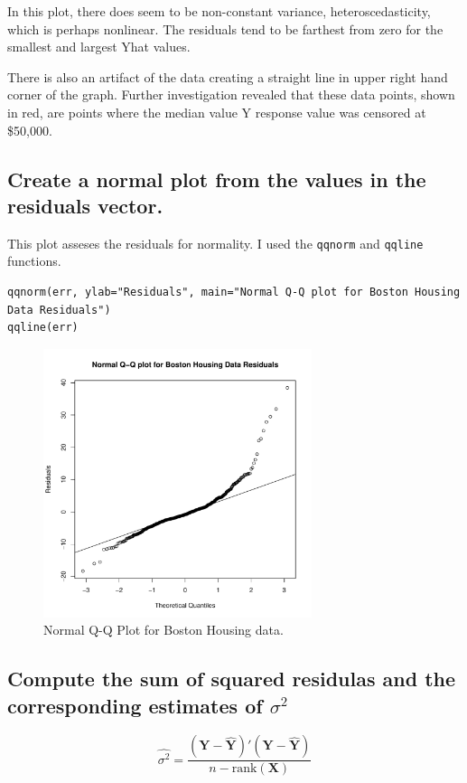 \documentclass[11pt]{article}
\begin{document}
In this plot, there does seem to be non-constant variance,
heteroscedasticity, which is perhaps nonlinear. The residuals 
tend to be farthest from zero for the smallest and largest Yhat
values.

There is also an artifact of the data creating a straight line in 
upper right hand corner of the graph. Further investigation revealed
that these data points, shown in red, are points where the median
value  Y response value was censored at \$50,000. 
\subsection{Create a normal plot from the values in the residuals vector.}
\label{sec-4-5}


This plot asseses the residuals for normality. I used the \verb~qqnorm~
and \verb~qqline~ functions. 


\begin{verbatim}
qqnorm(err, ylab="Residuals", main="Normal Q-Q plot for Boston Housing Data Residuals")
qqline(err)
\end{verbatim}

\begin{figure}[H]
\centering
\includegraphics[width=0.7\textwidth]{HW2_4e.pdf}
\caption{Normal Q-Q Plot for Boston Housing data.}
\end{figure}
\subsection{Compute the sum of squared residulas and the corresponding estimates of $\sigma$$^2$}
\label{sec-4-6}


\[ \hat{\sigma^2} =
\frac{(\mathbf{Y}-\hat{\mathbf{Y}})'(\mathbf{Y}-\hat{\mathbf{Y}})}{n -
\text{rank}(\mathbf{X})}
\]
\end{document}
